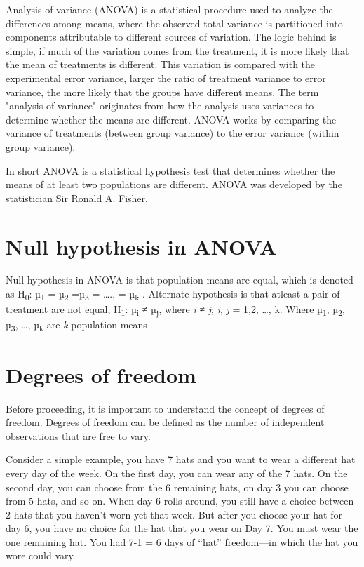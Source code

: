 \documentclass[
]{book}
\begin{document}
Analysis of variance (ANOVA) is a statistical procedure used to analyze
the differences among means, where the observed total variance is
partitioned into components attributable to different sources of
variation. The logic behind is simple, if much of the variation comes
from the treatment, it is more likely that the mean of treatments is
different. This variation is compared with the experimental error
variance, larger the ratio of treatment variance to error variance, the
more likely that the groups have different means. The term "analysis of
variance" originates from how the analysis uses variances to determine
whether the means are different. ANOVA works by comparing the variance
of treatments (between group variance) to the error variance (within
group variance).

In short ANOVA is a statistical hypothesis test that determines whether
the means of at least two populations are different. ANOVA was developed
by the statistician Sir Ronald A. Fisher.

\hypertarget{null-hypothesis-in-anova}{%
\section{Null hypothesis in ANOVA}\label{null-hypothesis-in-anova}}

Null hypothesis in ANOVA is that population means are equal, which is
denoted as H\textsubscript{0}: µ\textsubscript{1} = µ\textsubscript{2} =µ\textsubscript{3} = \ldots., = µ\textsubscript{k} . Alternate
hypothesis is that atleast a pair of treatment are not equal, H\textsubscript{1}: µ\textsubscript{i} ≠ µ\textsubscript{j}, where \emph{i} ≠ \emph{j}; \emph{i}, \emph{j} = 1,2, \ldots, k. Where µ\textsubscript{1}, µ\textsubscript{2}, µ\textsubscript{3}, \ldots, µ\textsubscript{k} are \emph{k} population means

\hypertarget{degrees-of-freedom-1}{%
\section{Degrees of freedom}\label{degrees-of-freedom-1}}

Before proceeding, it is important to understand the concept of degrees
of freedom. Degrees of freedom can be defined as the number of
independent observations that are free to vary.

Consider a simple example, you have 7 hats and you want to wear a
different hat every day of the week. On the first day, you can wear any
of the 7 hats. On the second day, you can choose from the 6 remaining
hats, on day 3 you can choose from 5 hats, and so on. When day 6 rolls
around, you still have a choice between 2 hats that you haven't worn yet
that week. But after you choose your hat for day 6, you have no choice
for the hat that you wear on Day 7. You must wear the one remaining hat.
You had 7-1 = 6 days of ``hat'' freedom---in which the hat you wore could
vary.
\end{document}
